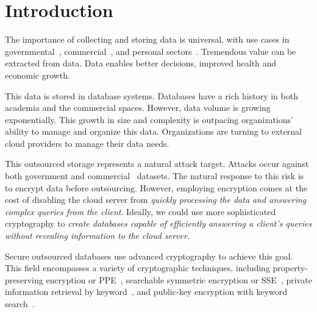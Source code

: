 
\section{Introduction}

The importance of collecting and storing data is universal, with use cases in governmental~\cite{Powers2014}, commercial~\cite{Linoff:2002:MWT:560274,insightdata}, and personal sectors~\cite{Mons2011}.  Tremendous value can be extracted from data.  Data enables better decisions, improved health and economic growth.

This data is stored in database systems.  Databases have a rich history in both academia and the commercial spaces.  However, data volume is growing exponentially.  This growth in size and complexity is outpacing organizations' ability to manage and
organize this data.  Organizations are turning to external cloud providers
to manage their data needs.  

This outsourced storage represents a natural attack target.  Attacks occur against both government \cite{CyberAttacksOPM} and commercial~\cite{CyberAttacks,gressin2017equifax} datasets.
The natural response to this risk is to encrypt data before outsourcing. 
%
However, employing encryption comes at the cost of disabling the cloud server
from {\em quickly processing the data and answering
complex queries from the client}. 
%
Ideally, we could use more sophisticated cryptography to {\em create databases
capable of efficiently answering a client's queries without revealing
information to the cloud server}.  


Secure outsourced databases use advanced cryptography to achieve this goal.  This field encompasses a variety of cryptographic techniques, including property-preserving encryption or PPE~\cite{EC:PanRou12}, searchable symmetric encryption or SSE~\cite{CCS:CGKO06}, private information retrieval by keyword~\cite{EPRINT:ChoGilNao98}, and public-key encryption with keyword search~\cite{EC:BDOP04}.  

